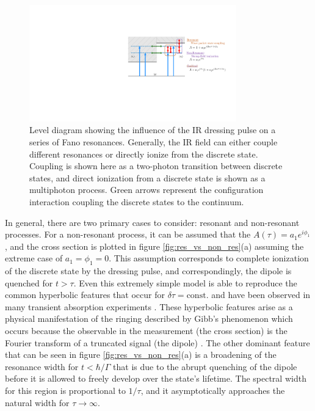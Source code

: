 \begin{figure}
	\centering
	\includegraphics[width=0.8\textwidth]{figures/ATS/level_diagram_dressing_3.pdf}
	\caption{Level diagram showing the influence of the IR dressing pulse on a series of Fano resonances. Generally, the IR field can either couple different resonances or directly ionize from the discrete state. Coupling is shown here as a two-photon transition between discrete states, and direct ionization from a discrete state is shown as a multiphoton process.  Green arrows represent the configuration interaction coupling the discrete states to the continuum.}
	\label{fig:level_diagram_dressing}
\end{figure}

In general, there are two primary cases to consider: resonant and non-resonant processes. For a non-resonant process, it can be assumed that the $A(\tau)=a_1e^{i\phi_1}$, and the cross section is plotted in figure \ref{fig:res_vs_non_res}(a) assuming the extreme case of $a_1=\phi_1=0$.  This assumption corresponds to complete ionization of the discrete state by the dressing pulse, and correspondingly, the dipole is quenched for $t>\tau$.  Even this extremely simple model is able to reproduce the common hyperbolic features that occur for $\delta\tau=\mathrm{const.}$ and have been observed in many transient absorption experiments \cite{wangAttosecondTimeResolvedAutoionization2010, ottReconstructionControlTimedependent2014, kaldunObservingUltrafastBuildup2016, wuTheoryStrongfieldAttosecond2016}.  These hyperbolic features arise as a physical manifestation of the ringing described by Gibb's phenomenon which occurs because the observable in the measurement (the cross section) is the Fourier transform of a truncated signal (the dipole) \cite{liInvestigationCouplingMechanisms2015, gibbsFourierSeries1898}. The other dominant feature that can be seen in figure  \ref{fig:res_vs_non_res}(a) is a broadening of the resonance width for $t<\hbar/\Gamma$ that is due to the abrupt quenching of the dipole before it is allowed to freely develop over the state's lifetime.  The spectral width for this region is proportional to $1/\tau$, and it asymptotically approaches the natural width for $\tau\rightarrow\infty$.

